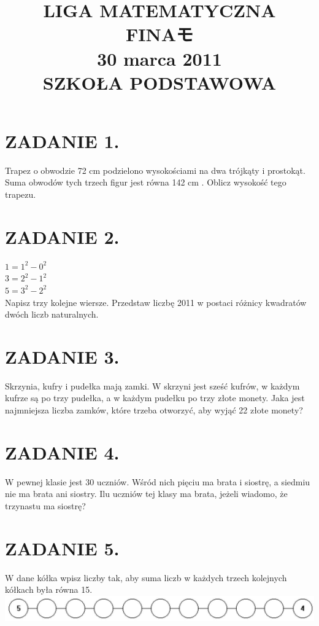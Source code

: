\documentclass[10pt]{article}
\title{LIGA MATEMATYCZNA \\
 FINAモ \\
 30 marca 2011 \\
 SZKOŁA PODSTAWOWA }
\author{}
\date{}
\begin{document}
\maketitle
\section*{ZADANIE 1.}
Trapez o obwodzie 72 cm podzielono wysokościami na dwa trójkąty i prostokąt. Suma obwodów tych trzech figur jest równa 142 cm . Oblicz wysokość tego trapezu.

\section*{ZADANIE 2.}
\(1=1^{2}-0^{2}\)\\
\(3=2^{2}-1^{2}\)\\
\(5=3^{2}-2^{2}\)\\
Napisz trzy kolejne wiersze. Przedstaw liczbę 2011 w postaci różnicy kwadratów dwóch liczb naturalnych.

\section*{ZADANIE 3.}
Skrzynia, kufry i pudełka mają zamki. W skrzyni jest sześć kufrów, w każdym kufrze są po trzy pudełka, a w każdym pudełku po trzy złote monety. Jaka jest najmniejsza liczba zamków, które trzeba otworzyć, aby wyjąć 22 złote monety?

\section*{ZADANIE 4.}
W pewnej klasie jest 30 uczniów. Wśród nich pięciu ma brata i siostrę, a siedmiu nie ma brata ani siostry. Ilu uczniów tej klasy ma brata, jeżeli wiadomo, że trzynastu ma siostrę?

\section*{ZADANIE 5.}
W dane kółka wpisz liczby tak, aby suma liczb w każdych trzech kolejnych kółkach była równa 15.\\
\includegraphics[max width=\textwidth, center]{2024_11_21_2300f3f933ebda9c3480g-1}
\end{document}
